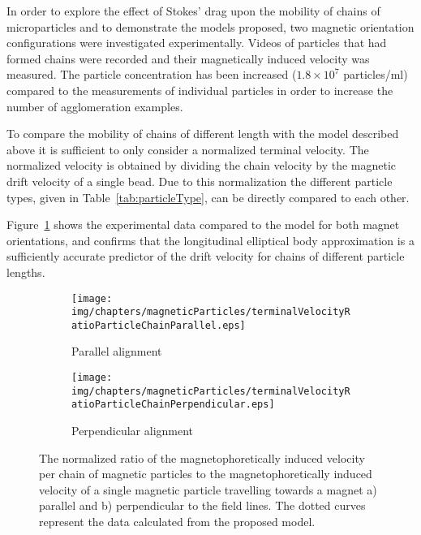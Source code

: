 In order to explore the effect of Stokes' drag upon the mobility of chains of microparticles and to demonstrate the models proposed, two magnetic orientation configurations were investigated experimentally. Videos of particles that had formed chains were recorded and their magnetically induced velocity was measured. The particle concentration has been increased ($1.8\times 10^{7}$ particles/ml) compared to the measurements of individual particles in order to increase the number of agglomeration examples. 

To compare the mobility of chains of different length with the model described above it is sufficient to only consider a normalized terminal velocity. The normalized velocity is obtained by dividing the chain velocity by the magnetic drift velocity of a single bead. Due to this normalization the different particle types, given in Table~\ref{tab:particleType}, can be directly compared to each other. 

Figure~\ref{fig:magnetophoreticVelocityOfDifferentChainLenghts} shows the experimental data compared to the model for both magnet orientations, and confirms that the longitudinal elliptical body approximation is a sufficiently accurate predictor of the drift velocity for chains of different particle lengths. 

\begin{figure}[htb]
        \centering
        \begin{subfigure}[b]{0.48\textwidth}
                \texttt{[image: img/chapters/magneticParticles/terminalVelocityRatioParticleChainParallel.eps]}
                \caption{Parallel alignment}
        \end{subfigure}
        \hfill
        \begin{subfigure}[b]{0.48\textwidth}
                \texttt{[image: img/chapters/magneticParticles/terminalVelocityRatioParticleChainPerpendicular.eps]}
                \caption{Perpendicular alignment}
        \end{subfigure}
        \caption[Normalized magnetophoretically induced velocity of different particle chain lengths]{The normalized ratio of the magnetophoretically induced velocity per chain of magnetic particles to the magnetophoretically induced velocity of a single magnetic particle travelling towards a magnet a) parallel and b) perpendicular to the field lines. The dotted curves represent the data calculated from the proposed model.}
        \label{fig:magnetophoreticVelocityOfDifferentChainLenghts}
\end{figure}

